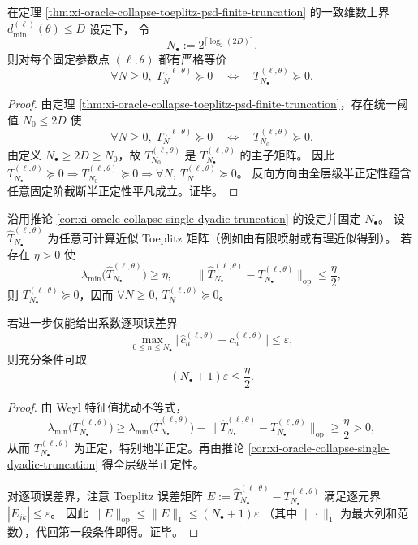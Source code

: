 \begin{corollary}[单一二进截断的全层级强制]\label{cor:xi-oracle-collapse-single-dyadic-truncation}
在定理 \ref{thm:xi-oracle-collapse-toeplitz-psd-finite-truncation} 的一致维数上界 \(d_{\min}^{(\ell)}(\theta)\le D\) 设定下，
令
\[
N_\bullet:=2^{\lceil\log_2(2D)\rceil}.
\]
则对每个固定参数点 \((\ell,\theta)\) 都有严格等价
\[
\forall N\ge 0,\;T^{(\ell,\theta)}_N\succeq 0
\quad\Longleftrightarrow\quad
T^{(\ell,\theta)}_{N_\bullet}\succeq 0.
\]
\end{corollary}
\begin{proof}
由定理 \ref{thm:xi-oracle-collapse-toeplitz-psd-finite-truncation}，存在统一阈值 \(N_0\le 2D\) 使
\[
\forall N\ge 0,\;T^{(\ell,\theta)}_N\succeq 0
\quad\Longleftrightarrow\quad
T^{(\ell,\theta)}_{N_0}\succeq 0.
\]
由定义 \(N_\bullet\ge 2D\ge N_0\)，故 \(T^{(\ell,\theta)}_{N_0}\) 是 \(T^{(\ell,\theta)}_{N_\bullet}\) 的主子矩阵。
因此 \(T^{(\ell,\theta)}_{N_\bullet}\succeq 0\Rightarrow T^{(\ell,\theta)}_{N_0}\succeq 0\Rightarrow \forall N,\ T^{(\ell,\theta)}_N\succeq 0\)。
反向方向由全层级半正定性蕴含任意固定阶截断半正定性平凡成立。证毕。
\end{proof}

\begin{corollary}\label{cor:xi-oracle-collapse-single-matrix-auditable-certificate}
沿用推论 \ref{cor:xi-oracle-collapse-single-dyadic-truncation} 的设定并固定 \(N_\bullet\)。
设 \(\widehat T^{(\ell,\theta)}_{N_\bullet}\) 为任意可计算近似 Toeplitz 矩阵（例如由有限喷射或有理近似得到）。
若存在 \(\eta>0\) 使
\[
\lambda_{\min}\!\bigl(\widehat T^{(\ell,\theta)}_{N_\bullet}\bigr)\ge \eta,
\qquad
\bigl\|\widehat T^{(\ell,\theta)}_{N_\bullet}-T^{(\ell,\theta)}_{N_\bullet}\bigr\|_{\mathrm{op}}\le \frac{\eta}{2},
\]
则 \(T^{(\ell,\theta)}_{N_\bullet}\succeq 0\)，因而 \(\forall N\ge 0,\ T^{(\ell,\theta)}_N\succeq 0\)。
\par
若进一步仅能给出系数逐项误差界
\[
\max_{0\le n\le N_\bullet}\bigl|\,\widehat c^{(\ell,\theta)}_n-c^{(\ell,\theta)}_n\,\bigr|\le \varepsilon,
\]
则充分条件可取
\[
(N_\bullet+1)\varepsilon\le \frac{\eta}{2}.
\]
\end{corollary}
\begin{proof}
由 Weyl 特征值扰动不等式，
\[
\lambda_{\min}\!\bigl(T^{(\ell,\theta)}_{N_\bullet}\bigr)
\ge
\lambda_{\min}\!\bigl(\widehat T^{(\ell,\theta)}_{N_\bullet}\bigr)
-\bigl\|\widehat T^{(\ell,\theta)}_{N_\bullet}-T^{(\ell,\theta)}_{N_\bullet}\bigr\|_{\mathrm{op}}
\ge \frac{\eta}{2}>0,
\]
从而 \(T^{(\ell,\theta)}_{N_\bullet}\) 为正定，特别地半正定。再由推论 \ref{cor:xi-oracle-collapse-single-dyadic-truncation} 得全层级半正定性。
\par
对逐项误差界，注意 Toeplitz 误差矩阵 \(E:=\widehat T^{(\ell,\theta)}_{N_\bullet}-T^{(\ell,\theta)}_{N_\bullet}\) 满足逐元界 \(|E_{jk}|\le \varepsilon\)。
因此
\(
\|E\|_{\mathrm{op}}\le \|E\|_{1}\le (N_\bullet+1)\varepsilon
\)
（其中 \(\|\cdot\|_1\) 为最大列和范数），代回第一段条件即得。证毕。
\end{proof}

